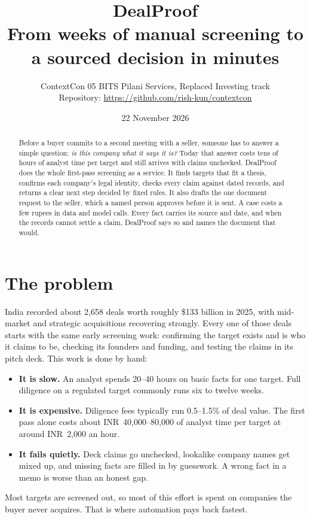 \documentclass[11pt,a4paper]{article}
\title{\textbf{DealProof}\\[0.3em]\large From weeks of manual screening to a sourced decision in minutes}
\author{ContextCon 05 \textperiodcentered{} BITS Pilani \textperiodcentered{} Services, Replaced \textperiodcentered{} Investing track\\
\small Repository: \url{https://github.com/rish-kun/contextcon}}
\date{22 November 2026}
\begin{document}
\maketitle

\begin{abstract}
\noindent Before a buyer commits to a second meeting with a seller, someone has to answer a simple question: \emph{is this company what it says it is?} Today that answer costs tens of hours of analyst time per target and still arrives with claims unchecked. DealProof does the whole first-pass screening as a service. It finds targets that fit a thesis, confirms each company's legal identity, checks every claim against dated records, and returns a clear next step decided by fixed rules. It also drafts the one document request to the seller, which a named person approves before it is sent. A case costs a few rupees in data and model calls. Every fact carries its source and date, and when the records cannot settle a claim, DealProof says so and names the document that would.
\end{abstract}

\section{The problem}
India recorded about 2,658 deals worth roughly \$133 billion in 2025, with mid-market and strategic acquisitions recovering strongly. Every one of those deals starts with the same early screening work: confirming the target exists and is who it claims to be, checking its founders and funding, and testing the claims in its pitch deck. This work is done by hand:
\begin{itemize}
  \item \textbf{It is slow.} An analyst spends 20--40 hours on basic facts for one target. Full diligence on a regulated target commonly runs six to twelve weeks.
  \item \textbf{It is expensive.} Diligence fees typically run 0.5--1.5\% of deal value. The first pass alone costs about INR~40,000--80,000 of analyst time per target at around INR~2,000 an hour.
  \item \textbf{It fails quietly.} Deck claims go unchecked, lookalike company names get mixed up, and missing facts are filled in by guesswork. A wrong fact in a memo is worse than an honest gap.
\end{itemize}
Most targets are screened out, so most of this effort is spent on companies the buyer never acquires. That is where automation pays back fastest.
\end{document}
